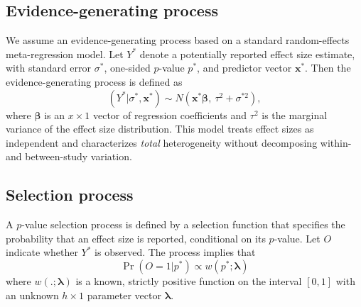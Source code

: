 \documentclass[
  man, donotrepeattitle,floatsintext]{apa7}
\begin{document}
\subsection{Evidence-generating process}\label{evidence-generating-process}

We assume an evidence-generating process based on a standard random-effects meta-regression model. Let \(Y^*\) denote a potentially reported effect size estimate, with standard error \(\sigma^*\), one-sided \(p\)-value \(p^*\), and predictor vector \(\mathbf{x}^*\). Then the evidence-generating process is defined as
\begin{equation}
\label{eq:meta-mean-regression}
\left(Y^* | \sigma^*, \mathbf{x}^*\right) \sim N\left(\mathbf{x}^* \boldsymbol\beta, \ \tau^2 + \sigma^{*2}\right),
\end{equation}
where \(\boldsymbol\beta\) is an \(x \times 1\) vector of regression coefficients and \(\tau^2\) is the marginal variance of the effect size distribution. This model treats effect sizes as independent and characterizes \emph{total} heterogeneity without decomposing within- and between-study variation.

\subsection{Selection process}\label{selection-process}

A \(p\)-value selection process is defined by a selection function that specifies the probability that an effect size is reported, conditional on its \(p\)-value. Let \(O\) indicate whether \(Y^*\) is observed. The process implies that
\begin{equation}
\label{eq:selection-process}
\Pr\left(O = 1 | p^* \right) \propto w\left(p^*; \boldsymbol\lambda \right)
\end{equation}
where \(w\left(.; \boldsymbol\lambda\right)\) is a known, strictly positive function on the interval \([0, 1]\) with an unknown \(h \times 1\) parameter vector \(\boldsymbol\lambda\).
\end{document}
